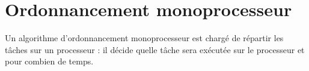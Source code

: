 

\section{Ordonnancement monoprocesseur}
\vspace{-1cm}
Un algorithme d’ordonnancement monoprocesseur est chargé de répartir les tâches sur un processeur : il décide quelle tâche sera exécutée sur le processeur et pour combien de temps. 
